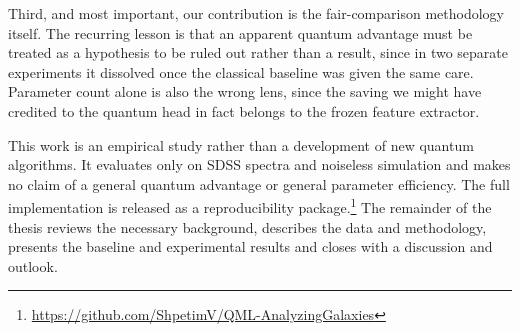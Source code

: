 Third, and most important, our contribution is the fair-comparison methodology itself.
The recurring lesson is that an apparent quantum advantage must be treated as a
hypothesis to be ruled out rather than a result, since in two separate experiments it
dissolved once the classical baseline was given the same care. Parameter count alone is
also the wrong lens, since the saving we might have credited to the quantum head in fact
belongs to the frozen feature extractor.

This work is an empirical study rather than a development of new quantum
algorithms. It evaluates only on SDSS spectra and noiseless simulation and makes no
claim of a general quantum advantage or general parameter efficiency. The full
implementation is released as a reproducibility
package.\footnote{\url{https://github.com/ShpetimV/QML-AnalyzingGalaxies}} The
remainder of the thesis reviews the necessary background, describes the data and
methodology, presents the baseline and experimental results and closes with a
discussion and outlook.
